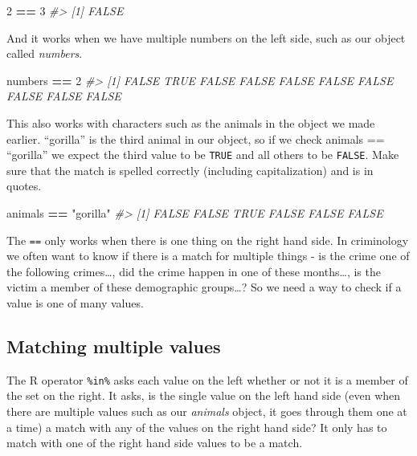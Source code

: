 \documentclass[
  12pt,
]{book}
\newenvironment{Shaded}{\begin{snugshade}}{\end{snugshade}}
\newcommand{\CommentTok}[1]{\textcolor[rgb]{0.37,0.37,0.37}{\textit{#1}}}
\newcommand{\DecValTok}[1]{\textcolor[rgb]{0.06,0.06,0.06}{#1}}
\newcommand{\NormalTok}[1]{#1}
\newcommand{\OperatorTok}[1]{\textcolor[rgb]{0.43,0.43,0.43}{\textbf{#1}}}
\newcommand{\StringTok}[1]{\textcolor[rgb]{0.5,0.5,0.5}{#1}}
\begin{document}
\begin{Shaded}
\begin{Highlighting}[]
\DecValTok{2} \OperatorTok{==}\StringTok{ }\DecValTok{3}
\CommentTok{\#\textgreater{} [1] FALSE}
\end{Highlighting}
\end{Shaded}

And it works when we have multiple numbers on the left side, such as our object called \emph{numbers}.

\begin{Shaded}
\begin{Highlighting}[]
\NormalTok{numbers }\OperatorTok{==}\StringTok{ }\DecValTok{2}
\CommentTok{\#\textgreater{}  [1] FALSE  TRUE FALSE FALSE FALSE FALSE FALSE FALSE FALSE FALSE}
\end{Highlighting}
\end{Shaded}

This also works with characters such as the animals in the object we made earlier. ``gorilla'' is the third animal in our object, so if we check animals == ``gorilla'' we expect the third value to be \texttt{TRUE} and all others to be \texttt{FALSE}. Make sure that the match is spelled correctly (including capitalization) and is in quotes.

\begin{Shaded}
\begin{Highlighting}[]
\NormalTok{animals }\OperatorTok{==}\StringTok{ "gorilla"}
\CommentTok{\#\textgreater{} [1] FALSE FALSE  TRUE FALSE FALSE FALSE}
\end{Highlighting}
\end{Shaded}

The \texttt{==} only works when there is one thing on the right hand side. In criminology we often want to know if there is a match for multiple things - is the crime one of the following crimes\ldots, did the crime happen in one of these months\ldots, is the victim a member of these demographic groups\ldots? So we need a way to check if a value is one of many values.

\hypertarget{matching-multiple-values}{%
\subsection{Matching multiple values}\label{matching-multiple-values}}

The R operator \texttt{\%in\%} asks each value on the left whether or not it is a member of the set on the right. It asks, is the single value on the left hand side (even when there are multiple values such as our \emph{animals} object, it goes through them one at a time) a match with any of the values on the right hand side? It only has to match with one of the right hand side values to be a match.
\end{document}
